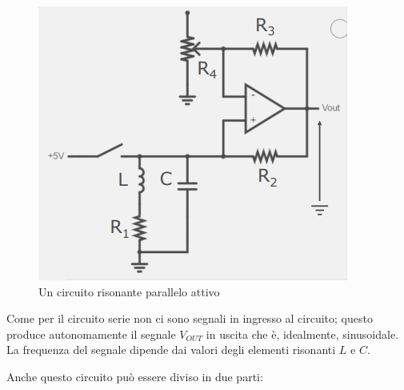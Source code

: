 \documentclass{article}
\begin{document}
\begin{figure}[h]
  \centering
  \includegraphics[scale=0.7]{IM_circuito_risonante_parallelo_attivo}
  \caption{Un circuito risonante parallelo attivo}
  \label{Schema_circuito_risonante_parallelo_attivo}
\end{figure}

Come per il circuito serie non ci sono segnali in ingresso al circuito; questo produce autonomamente il segnale $V_{OUT}$ in uscita che è, idealmente, sinusoidale. La frequenza del segnale dipende dai valori degli elementi risonanti $L$ e $C$.

\vspace{1mm}

Anche questo circuito può essere diviso in due parti:
\end{document}
